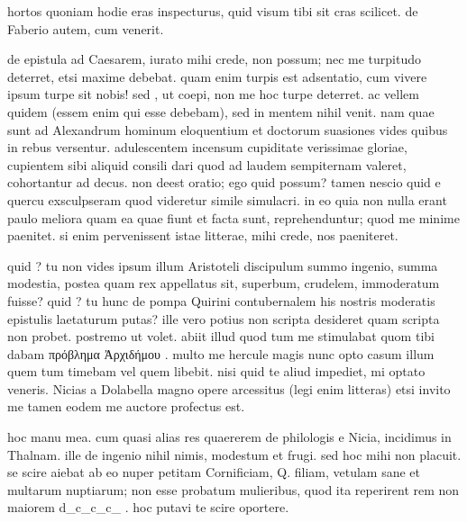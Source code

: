 


 hortos quoniam hodie eras inspecturus, quid visum tibi sit cras scilicet. de Faberio autem, cum venerit.

 de epistula ad Caesarem, iurato mihi crede, non possum; nec me turpitudo deterret, etsi maxime debebat. quam enim turpis est adsentatio, cum vivere ipsum turpe sit nobis! sed , ut coepi, non me hoc turpe deterret. ac vellem quidem (essem enim qui esse debebam), sed in mentem nihil venit. nam quae sunt ad Alexandrum hominum eloquentium et doctorum suasiones vides quibus in rebus versentur. adulescentem incensum cupiditate verissimae gloriae, cupientem sibi aliquid consili dari quod ad laudem sempiternam valeret, cohortantur ad decus. non deest oratio; ego quid possum? tamen nescio quid e quercu exsculpseram quod videretur simile simulacri. in eo quia non nulla erant paulo meliora quam ea quae fiunt et facta sunt, reprehenduntur; quod me minime paenitet. si enim pervenissent istae litterae, mihi crede, nos paeniteret.

 quid ? tu non vides ipsum illum Aristoteli discipulum summo ingenio, summa modestia, postea quam rex appellatus sit, superbum, crudelem, immoderatum fuisse? quid ? tu hunc de pompa Quirini contubernalem his nostris moderatis epistulis laetaturum putas? ille vero potius non scripta desideret quam scripta non probet. postremo ut volet. abiit illud quod tum me stimulabat quom tibi dabam πρόβλημα Ἀρχιδήμου . multo me hercule magis nunc opto casum illum quem tum timebam vel quem libebit. nisi quid te aliud impediet, mi optato veneris. Nicias a Dolabella magno opere arcessitus (legi enim litteras) etsi invito me tamen eodem me auctore profectus est.

 hoc manu mea. cum quasi alias res quaererem de philologis e Nicia, incidimus in Thalnam. ille de ingenio nihil nimis, modestum et frugi. sed hoc mihi non placuit. se scire aiebat ab eo nuper petitam Cornificiam, Q. filiam, vetulam sane et multarum nuptiarum; non esse probatum mulieribus, quod ita reperirent rem non maiorem d_c_c_c_ . hoc putavi te scire oportere.
